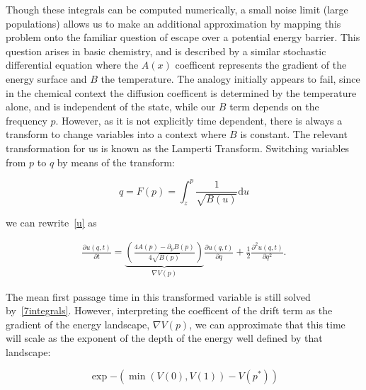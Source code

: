 \documentclass[letterpaper,10pt]{article}
\newcommand{\ud}{\mathrm{d}}
\begin{document}
Though these integrals can be computed numerically, a small noise limit (large populations) allows us to make an additional approximation by mapping this problem onto the familiar question of escape over a potential energy barrier.  This question arises in basic chemistry, and is described by a similar stochastic differential equation where the $A(x)$ coefficent represents the gradient of the energy surface and $B$ the temperature.  The analogy initially appears to fail, since in the chemical context the diffusion coefficent is determined by the temperature alone, and is independent of the state, while our $B$ term depends on the frequency $p$.  However, as it is not explicitly time dependent, there is always a transform to change variables into a context where $B$ is constant.  The relevant transformation for us is known as the Lamperti Transform.  Switching variables from $p$ to $q$ by means of the transform:

\begin{equation}
q = F(p) = \int_z^{p} \frac{1}{\sqrt{B(u)}} \ud u
\label{p_to_q}
\end{equation}

we can rewrite~\eqref{u} as

\begin{align}
\frac{\partial u(q,t)}{\partial t} = \underbrace{\left(\frac{4 A(p)- \partial_p B(p) }{4\sqrt{B(p)}}  \right)}_{\nabla V(p)} \frac{\partial u(q,t)}{\partial q} + \frac{1}{2} \frac{\partial^2 u(q,t)}{\partial q^2}.
\label{new_u}
\end{align}

The mean first passage time in this transformed variable is still solved by~\eqref{7integrals}.  However, interpreting the coefficent of the drift term as the gradient of the energy landscape, $\nabla V(p)$, we can approximate that this time will scale as the exponent of the depth of the energy well defined by that landscape:

\begin{equation}
\exp{- (\min(V(0), V(1)) - V(p^*) )}
\end{equation}
\end{document}
